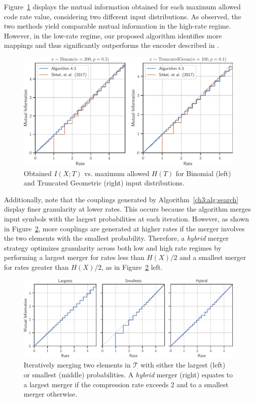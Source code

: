 Figure~\ref{ch3:fig:yanina} displays the mutual information obtained for each maximum allowed code rate value, considering two different input distributions. As observed, the two methods yield comparable mutual information in the high-rate regime. However, in the low-rate regime, our proposed algorithm identifies more mappings and thus significantly outperforms the encoder described in \cite{shkel2017single}.

\begin{figure}
    \centering
    \includegraphics[width=\linewidth]{figs/ch3/yanina.pdf}
    \caption{
        Obtained $I(X;T)$ vs. maximum allowed $H(T)$ for Binomial (left) and Truncated Geometric (right) input distributions.
    }
    \label{ch3:fig:yanina}
\end{figure}
\FloatBarrier

Additionally, note that the couplings generated by Algorithm~\ref{ch3:alg:search} display finer granularity at lower rates. This occurs because the algorithm merges input symbols with the largest probabilities at each iteration. However, as shown in Figure~\ref{ch3:fig:hybrid}, more couplings are generated at higher rates if the merger involves the two elements with the smallest probability. Therefore, a \textit{hybrid} merger strategy optimizes granularity across both low and high rate regimes by performing a largest merger for rates less than \(H(X)/2\) and a smallest merger for rates greater than \(H(X)/2\), as in Figure~\ref{ch3:fig:hybrid} left. 

\begin{figure}[!h]
    \centering
    \includegraphics[width=\linewidth]{figs/ch3/hybrid.pdf}
    \caption{
        Iteratively merging two elements in $\mathcal{T}$ with either the largest (left) or smallest (middle) probabilities. A \textit{hybrid} merger (right) equates to a largest merger if the compression rate exceeds 2 and to a smallest merger otherwise.
    }
    \label{ch3:fig:hybrid}
\end{figure}
\FloatBarrier

